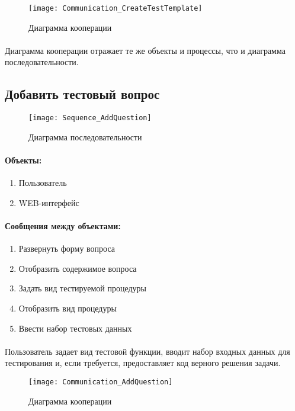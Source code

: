 \documentclass{article}
\begin{document}
        \begin{figure}[H]
            \texttt{[image: Communication\_CreateTestTemplate]}
            \caption{Диаграмма кооперации}
        \end{figure}
        \paragraph{}
        Диаграмма кооперации отражает те же объекты и процессы, что и диаграмма
        последовательности.


    \subsection{Добавить тестовый вопрос}
        \begin{figure}[H]
            \texttt{[image: Sequence\_AddQuestion]}
            \caption{Диаграмма последовательности}
        \end{figure}
        \paragraph{Объекты:}
        \begin{enumerate}
            \item Пользователь
            \item WEB-интерфейс
        \end{enumerate}
        \paragraph{Сообщения между объектами:}
        \begin{enumerate}
            \item Развернуть форму вопроса
            \item Отобразить содержимое вопроса
            \item Задать вид тестируемой процедуры
            \item Отобразить вид процедуры        
            \item Ввести набор тестовых данных        
        \end{enumerate}
        \paragraph{}
        Пользователь задает вид тестовой функции, вводит набор входных данных
        для тестирования и, если требуется, предоставляет код верного решения задачи.
        \begin{figure}[H]
            \texttt{[image: Communication\_AddQuestion]}
            \caption{Диаграмма кооперации}
        \end{figure}
\end{document}
